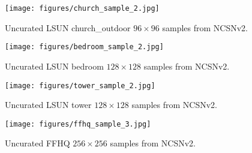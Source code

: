 \documentclass{article}
\begin{document}
\newpage
\vspace*{\fill}
\begin{figure}[H]
    \centering
    \texttt{[image: figures/church\_sample\_2.jpg]}
    \caption{Uncurated LSUN church\_outdoor $96\times 96$ samples from NCSNv2.}
    \label{fig:church_full}
\end{figure}
\vspace*{\fill}

\newpage
\vspace*{\fill}
\begin{figure}[H]
    \centering
    \texttt{[image: figures/bedroom\_sample\_2.jpg]}
    \caption{Uncurated LSUN bedroom $128\times 128$ samples from NCSNv2.}
    \label{fig:bedroom_full}
\end{figure}
\vspace*{\fill}


\newpage
\vspace*{\fill}
\begin{figure}[H]
    \centering
    \texttt{[image: figures/tower\_sample\_2.jpg]}
    \caption{Uncurated LSUN tower $128\times 128$ samples from NCSNv2.}
    \label{fig:tower_full}
\end{figure}
\vspace*{\fill}

\newpage
\vspace*{\fill}
\begin{figure}[H]
    \centering
    \texttt{[image: figures/ffhq\_sample\_3.jpg]}
    \caption{Uncurated FFHQ $256\times 256$ samples from NCSNv2.}
    \label{fig:ffhq_full}
\end{figure}
\vspace*{\fill} 
\end{document}
